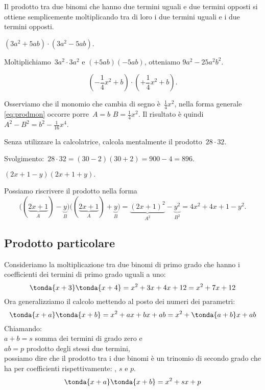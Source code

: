 \osservazione Il prodotto tra due binomi che hanno due termini
uguali e due termini opposti si ottiene semplicemente moltiplicando tra
di loro i due termini uguali e i due termini opposti.

\begin{exrig}
 \begin{esempio}
$\left(3a^{2}+5{ab}\right)\cdot \left(3a^{2}-5{ab}\right).$

Moltiplichiamo~$3a^{2}\cdot 3a^{2}$ e
$\left(+5{ab}\right)\left(-5{ab}\right)$, otteniamo
$9a^{2}-25a^{2}b^{2}$.
 \end{esempio}

 \begin{esempio}
 \[\left(-{\frac{1}{4}}x^{2}+b\right)\cdot 
\left(+{\frac{1}{4}}x^{2}+b\right).\]

Osserviamo che il monomio che cambia di segno è~$\frac{1}{4}x^{2}$,
nella forma generale \eqref{eq:prodmon} occorre porre~$A=b$ 
$B=\frac{1}{4}x^{2}$.
Il risultato è quindi~$A^{2}-B^{2}=b^{2}-\frac{1}{16}x^{4}$.
 \end{esempio}

 \begin{esempio}
 Senza utilizzare la calcolatrice, calcola mentalmente il prodotto~$28\cdot 
32$.

Svolgimento:~$28\cdot 32=(30-2)(30+2)=900-4=896$.
 \end{esempio}

 \begin{esempio}
$(2x+1-y)(2x+1+y).$

Possiamo riscrivere il prodotto nella forma
\[\big((\underbrace{2x+1}_{A})-\underbrace{y}_{B}\big)\big((\underbrace{2x+1
}_{A})+\underbrace{y}_{B}\big)=\underbrace{(2x+1)^{2}}_{A^{2}}-\underbrace{
y^{2}}_{B^{2}}=4x^{2}+4x+1-y^{2}.\]
 \end{esempio}

\end{exrig}


\subsection{Prodotto particolare}
\label{subsec:11_prodnot_particolare}

Consideriamo la moltiplicazione tra due binomi di primo grado che hanno i 
coefficienti dei termini di primo grado uguali a uno:
\[\tonda{x +3} \tonda{x+4} = x^2 +3x +4x +12 = x^2 +7x +12\]
Ora generalizziamo il calcolo mettendo al posto dei numeri dei parametri:
\[\tonda{x +a} \tonda{x+b} = x^2 +ax +bx +ab = x^2 +\tonda{a+b}x +ab\]
Chiamando:\\
\(a+b=s\) \quad somma dei termini di grado zero e\\
\(ab=p\) \quad prodotto degli stessi due termini,\\
possiamo dire che il prodotto tra i due binomi è un trinomio di secondo 
grado che ha per coefficienti rispettivamente: , \(s\) e \(p\).
\[\tonda{x +a} \tonda{x+b} = x^2 +sx +p\]

